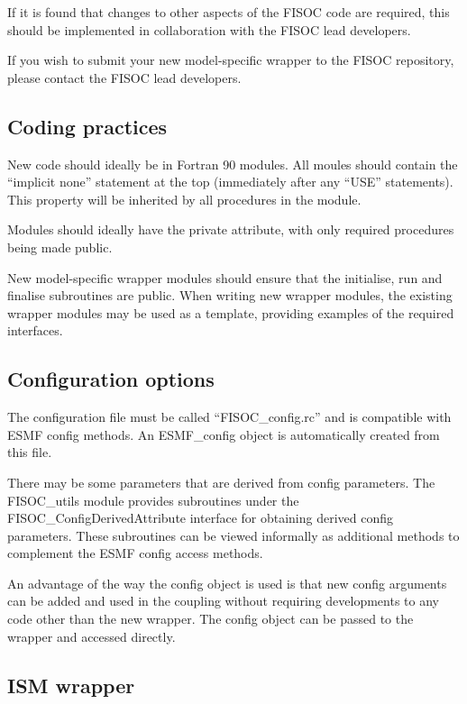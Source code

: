 \documentclass[12pt]{article}
\begin{document}
If it is found that changes to other aspects of the FISOC code are required, this should be 
implemented in collaboration with the FISOC lead developers.

If you wish to submit your new model-specific wrapper to the FISOC repository, please contact 
the FISOC lead developers.


\subsection{Coding practices}

New code should ideally be in Fortran 90 modules.  
All moules should contain the ``implicit none'' statement at the top (immediately after any 
``USE'' statements).  This property will be inherited by all procedures in the module.

Modules should ideally have the private attribute, with only required procedures being 
made public. 

New model-specific wrapper modules should ensure that the initialise, run and finalise 
subroutines are public. 
When writing new wrapper modules, the existing wrapper modules may be used as a template, 
providing examples of the required interfaces.


\subsection{Configuration options}

The configuration file must be called ``FISOC\_config.rc'' and is compatible with ESMF 
config methods.  
An ESMF\_config object is automatically created from this file.

There may be some parameters that are derived from config parameters.  
The FISOC\_utils module provides subroutines under the 
FISOC\_ConfigDerivedAttribute interface 
for obtaining derived config parameters.
These subroutines can be viewed informally as additional methods to complement the ESMF config access methods. 

An advantage of the way the config object is used is that new config arguments can be added and 
used in the coupling without requiring developments to any code other than the new wrapper. 
The config object can be passed to the wrapper and accessed directly. 


\subsection{ISM wrapper}
\end{document}
